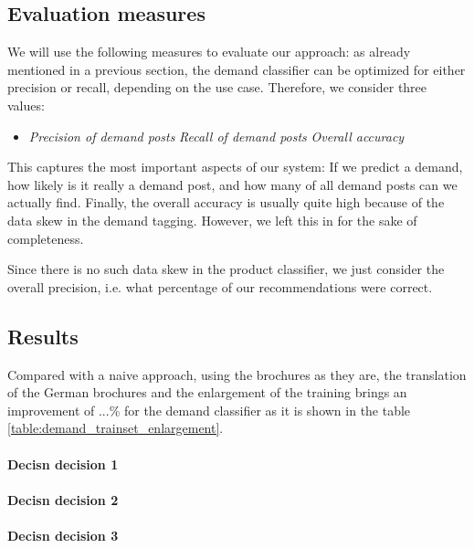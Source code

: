 
\subsection{Evaluation measures}
\label{sub:evaluation_measures}
We will use the following measures to evaluate our approach:
as already mentioned in a previous section, the demand classifier can be optimized for either precision or recall, depending on the use case.
Therefore, we consider three values:
\begin{itemize}
	\item
		\emph{Precision of demand posts} 
		\emph{Recall of demand posts} 
		\emph{Overall accuracy}
\end{itemize}
This captures the most important aspects of our system: If we predict a demand, how likely is it really a demand post, and how many of all demand posts can we actually find.
Finally, the overall accuracy is usually quite high because of the data skew in the demand tagging.
However, we left this in for the sake of completeness.

Since there is no such data skew in the product classifier, we just consider the overall precision, i.e. what percentage of our recommendations were correct.


\subsection{Results} %
\label{sub:results}

Compared with a naive approach, using the brochures as they are, the translation of the German brochures and the enlargement of the training brings an improvement of ...\% for the demand classifier as it is shown in the table \ref{table:demand_trainset_enlargement}.
\paragraph{Decisn decision 1}
\paragraph{Decisn decision 2}
\paragraph{Decisn decision 3}

\endinput
\begin{itemize}
	\item Introduce our data set (show numbers, show examples)
	\item How we got our training data (everything at least twice, use the demands for learning, use the products for evaluation, Active Learning approach)
	\item Reference Precision/Recall from above again, final
	\item Evaluate of the training data generation, which approach is best (random, grouping)
\end{itemize}


